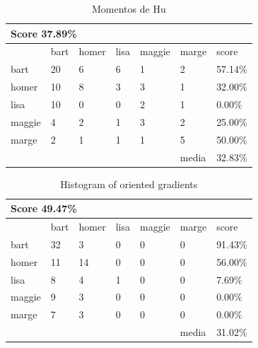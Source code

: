 \documentclass[paper=a4, fontsize=11pt]{scrartcl} %
\numberwithin{equation}{section} %
\numberwithin{figure}{section} %
\numberwithin{table}{section} %
\begin{document}
\begin{table}[!htb]
\centering
\caption{Momentos de Hu}
\label{tbl:humoments}
\begin{tabular}{|l|l|l|l|l|l|l|}
\hline
\multicolumn{7}{|l|}{\textbf{Score 37.89\%}}                                          \\ \hline
            & bart      & homer      & lisa      & maggie     & marge    & score      \\ \hline
bart        & 20        & 6          & 6         & 1          & 2        & 57.14\%    \\ \hline
homer       & 10        & 8          & 3         & 3          & 1        & 32.00\%    \\ \hline
lisa        & 10        & 0          & 0         & 2          & 1        & 0.00\%     \\ \hline
maggie      & 4         & 2          & 1         & 3          & 2        & 25.00\%    \\ \hline
marge       & 2         & 1          & 1         & 1          & 5        & 50.00\%    \\ \hline
            &           &            &           &            & media    & 32.83\%    \\ \hline
\end{tabular}
\end{table}

\begin{table}[!htb]
\centering
\caption{Histogram of oriented gradients}
\label{tbl:hog}
\begin{tabular}{|l|l|l|l|l|l|l|}
\hline
\multicolumn{7}{|l|}{\textbf{Score 49.47\%}}                                          \\ \hline
            & bart      & homer      & lisa      & maggie     & marge    & score      \\ \hline
bart        & 32        & 3          & 0         & 0          & 0        & 91.43\%    \\ \hline
homer       & 11        & 14         & 0         & 0          & 0        & 56.00\%    \\ \hline
lisa        & 8         & 4          & 1         & 0          & 0        & 7.69\%     \\ \hline
maggie      & 9         & 3          & 0         & 0          & 0        & 0.00\%     \\ \hline
marge       & 7         & 3          & 0         & 0          & 0        & 0.00\%     \\ \hline
            &           &            &           &            & media    & 31.02\%    \\ \hline
\end{tabular}
\end{table}
\end{document}
